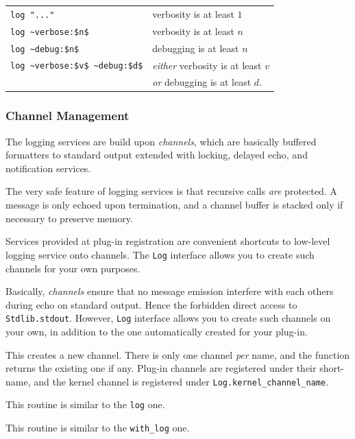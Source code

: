 \begin{tabular}{ll}
  \lstinline|log "..."| & verbosity is at least $1$ \\
  \lstinline|log ~verbose:$n$| & verbosity is at least $n$ \\
  \lstinline|log ~debug:$n$| & debugging is at least $n$ \\
  \lstinline|log ~verbose:$v$ ~debug:$d$|
  & \emph{either} verbosity is at least $v$ \\
  & \emph{or} debugging is at least $d$.
\end{tabular}

\subsubsection{Channel Management}

The logging services are build upon \emph{channels}, which are
basically buffered formatters to standard output extended with
locking, delayed echo, and notification services.

The very safe feature of logging services is that recursive calls
\emph{are} protected. A message is only echoed upon termination,
and a channel buffer is stacked only if necessary to preserve memory.

Services provided at plug-in registration are convenient shortcuts to
low-level logging service onto channels. The \lstinline{Log} interface
allows you to create such channels for your own purposes.

Basically, \emph{channels} ensure that no message emission interfere
with each others during echo on standard output. Hence the forbidden
direct access to \lstinline{Stdlib.stdout}. However,
\lstinline{Log} interface allows you to create such channels on your
own, in addition to the one automatically created for your plug-in.

\begin{description}
  This creates a new channel. There is only one channel \emph{per}
  name, and the function returns the existing one if
  any. Plug-in channels are registered under their short-name, and
  the kernel channel is registered under \lstinline{Log.kernel_channel_name}.

  This routine is similar to the \lstinline{log} one.

  This routine is similar to the \lstinline{with_log} one.
\end{description}

